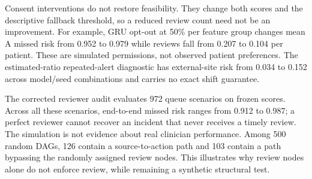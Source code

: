 Consent interventions do not restore feasibility. They change both scores and the descriptive fallback threshold, so a reduced review count need not be an improvement. For example, GRU opt-out at 50\% per feature group changes mean A missed risk from 0.952 to 0.979 while reviews fall from 0.207 to 0.104 per patient. These are simulated permissions, not observed patient preferences. The estimated-ratio repeated-alert diagnostic has external-site risk from 0.034 to 0.152 across model/seed combinations and carries no exact shift guarantee.

The corrected reviewer audit evaluates 972 queue scenarios on frozen scores. Across all these scenarios, end-to-end missed risk ranges from 0.912 to 0.987; a perfect reviewer cannot recover an incident that never receives a timely review. The simulation is not evidence about real clinician performance. Among 500 random DAGs, 126 contain a source-to-action path and 103 contain a path bypassing the randomly assigned review nodes. This illustrates why review nodes alone do not enforce review, while remaining a synthetic structural test.

